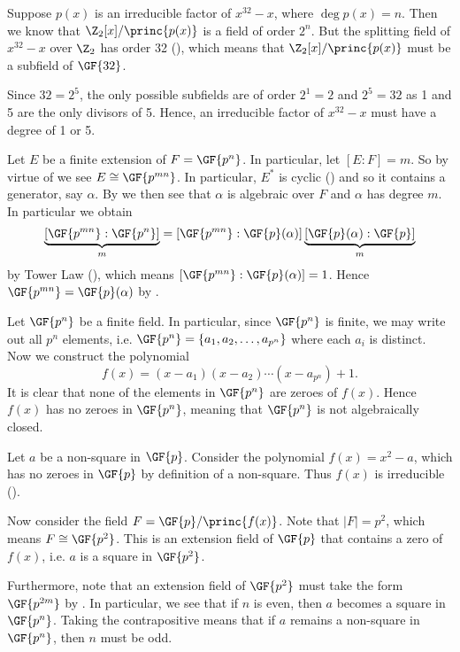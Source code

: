 \begin{questions}
    \item Suppose $p(x)$ is an irreducible factor of $x^{32} - x$, where $\deg p(x) = n$. Then we know that $\Z_2[x]/\princ{p(x)}$ is a field of order $2^n$. But the splitting field of $x^{32} - x$ over $\Z_2$ has order 32 (), which means that $\Z_2[x]/\princ{p(x)}$ must be a subfield of $\GF{32}$.
    
    Since $32 = 2^5$, the only possible subfields are of order $2^1 = 2$ and $2^5 = 32$ as 1 and 5 are the only divisors of 5. Hence, an irreducible factor of $x^{32} - x$ must have a degree of 1 or 5.
    
    \item Let $E$ be a finite extension of $F = \GF{p^n}$. In particular, let $[E:F] = m$. So by virtue of  we see $E \cong \GF{p^{mn}}$. In particular, $E^\ast$ is cyclic () and so it contains a generator, say $\alpha$. By  we then see that $\alpha$ is algebraic over $F$ and $\alpha$ has degree $m$. In particular we obtain
    \[
        \underbrace{[\GF{p^{mn}}:\GF{p^n}]}_m = [\GF{p^{mn}}:\GF{p}(\alpha)]\underbrace{[\GF{p}(\alpha):\GF{p}]}_{m}
    \]
    by Tower Law (), which means $[\GF{p^{mn}}:\GF{p}(\alpha)] = 1$. Hence $\GF{p^{mn}} = \GF{p}(\alpha)$ by .
    
    \item Let $\GF{p^n}$ be a finite field. In particular, since $\GF{p^n}$ is finite, we may write out all $p^n$ elements, i.e. $\GF{p^n} = \{a_1, a_2, \dots, a_{p^n}\}$ where each $a_i$ is distinct. Now we construct the polynomial
    \[
        f(x) = (x-a_1)(x-a_2)\cdots(x-a_{p^n}) + 1.
    \]
    It is clear that none of the elements in $\GF{p^n}$ are zeroes of $f(x)$. Hence $f(x)$ has no zeroes in $\GF{p^n}$, meaning that $\GF{p^n}$ is not algebraically closed.
    
    \item Let $a$ be a non-square in $\GF{p}$. Consider the polynomial $f(x) = x^2 - a$, which has no zeroes in $\GF{p}$ by definition of a non-square. Thus $f(x)$ is irreducible ().
    
    Now consider the field $F = \GF{p}/\princ{f(x)}$. Note that $|F| = p^2$, which means $F \cong \GF{p^2}$. This is an extension field of $\GF{p}$ that contains a zero of $f(x)$, i.e. $a$ is a square in $\GF{p^2}$.

    Furthermore, note that an extension field of $\GF{p^2}$ must take the form $\GF{p^{2m}}$ by . In particular, we see that if $n$ is even, then $a$ becomes a square in $\GF{p^n}$. Taking the contrapositive means that if $a$ remains a non-square in $\GF{p^n}$, then $n$ must be odd.
\end{questions}
